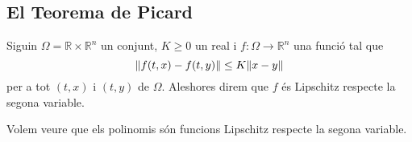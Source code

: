 \documentclass[../../Main.tex]{subfiles}
\begin{document}
	\subsection{El Teorema de Picard}
	\begin{definition}
		\label{def:funció Lipschitz respecte la segona variable}
		Siguin \(\Omega=\mathbb{R}\times\mathbb{R}^{n}\) un conjunt, \(K\geq0\) un real i \(f\colon\Omega\longrightarrow\mathbb{R}^{n}\) una funció tal que
		\[
		    \norm{f(t,x)-f(t,y)}\leq K\norm{x-y}
		\]
		per a tot \((t,x)\) i \((t,y)\) de \(\Omega\).
		Aleshores direm que \(f\) és Lipschitz respecte la segona variable.
	\end{definition}
	\begin{example}
		\label{ex:els polinomis són funcions Lipschitz respecte la segona variable}
		Volem veure que els polinomis són funcions Lipschitz respecte la segona variable.
		\begin{solution}
		\end{solution}
	\end{example}
\end{document}

